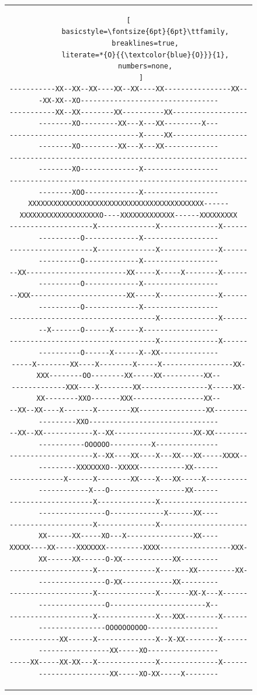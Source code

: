 \documentclass[12pt,a4paper]{article}
\begin{document}
\begin{figure}[H]
\begin{tabular}{c}
\begin{lstlisting}[
        basicstyle=\fontsize{6pt}{6pt}\ttfamily,
        breaklines=true,
        literate=*{O}{{\textcolor{blue}{O}}}{1},
        numbers=none,
      ]
-----------XX--XX--XX----XX--XX----XX----------------XX---XX-XX--XO---------------------------------
-----------XX--XX--------XX----------XX--------------------------XO---------XX---X---XX---------X---
-------------------------------X-----XX--------------------------XO---------XX---X---XX-------------
-----------------------------------------------------------------XO--------------X------------------
-----------------------------------------------------------------XOO-------------X------------------
XXXXXXXXXXXXXXXXXXXXXXXXXXXXXXXXXXXXXXXXXX------XXXXXXXXXXXXXXXXXXXO----XXXXXXXXXXXXX------XXXXXXXXX
--------------------X--------------X--------------X----------------O-------------X------------------
--------------------X--------------X--------------X----------------O-------------X------------------
--XX------------------------XX-----X-----X--------X----------------O-------------X------------------
--XXX-----------------------XX-----X--------------X----------------O-------------X------------------
-----------------------------------X--------------X--------X-------O------X------X------------------
-----------------------------------X--------------X----------------O------X------X--XX--------------
-----X--------XX----X--------X-----X-----------------XX-XXX--------OO--------XX-----XX----------XX--
-------------XXX----X--------XX----------------X-----XX-XX--------XXO-------XXX-----------------XX--
--XX--XX----X-------X--------XX----------------XX-----------------XXO-------------------------------
--XX--XX------------X--XX-------------------XX-XX-------------------OOOOOO----------X---------------
--------------------X--XX----XX----X---XX---XX-----XXXX-----------XXXXXXXO--XXXXX-----------XX------
-------------X------X--------XX----X---XX-----X----------------------X---O------------------XX------
--------------------X--------------X-------------------------------------O-------------X------XX----
--------------------X--------------X---------------------XX------XX-----XO---X----------------XX----
XXXXX----XX-----XXXXXXX---------XXXX-----------------XXX-XX------XX------O-XX------------XX---------
--------------------X--------------X-------XX---------XX-----------------O-XX------------XX---------
--------------------X--------------X-------XX-X---X----------------------O-----------------------X--
--------------------X--------------X---XXX--------X----------------------OOOOOOOOOO-----------------
------------XX------X--------------X--X-XX--------X-----------------------XX-----XO-----------------
-----XX-----XX-XX---X--------------X--------------X-----------------------XX-----XO-XX-----X--------

\end{lstlisting}
\end{tabular}
\end{figure}
\end{document}
